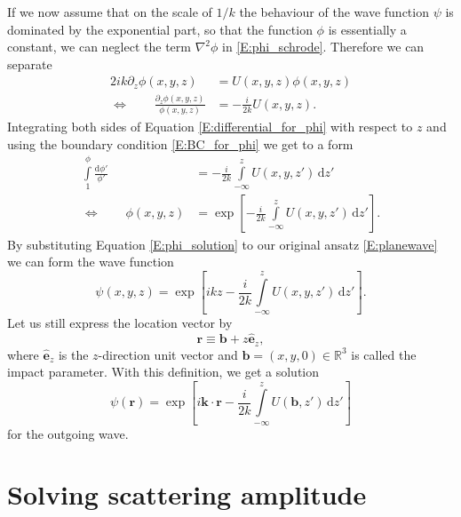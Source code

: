 \documentclass[a4paper, twoside, english, 12pt]{report}
\begin{document}
If we now assume that on the scale of $1/k$ the behaviour of the wave function $\psi$ is dominated by the exponential part, so that the function $\phi$ is essentially a constant, we can neglect the term $\nabla^2\phi$ in \eqref{E:phi_schrode}. Therefore we can separate
\begin{align}\label{E:differential_for_phi}
	2ik\partial_z\phi(x,y,z) &= U(x,y,z)\phi(x,y,z) \nonumber\\
\iff \qquad	\frac{\partial_z\phi(x,y,z)}{\phi(x,y,z)} &= -\frac{i}{2k}U(x,y,z).
\end{align}
Integrating both sides of Equation \eqref{E:differential_for_phi} with respect to $z$ and using the boundary condition \eqref{E:BC_for_phi} we get to a form
\begin{align}\label{E:phi_solution}
	\int\limits^{\phi}_{1}\frac{\text{d}\phi'}{\phi'} &= -\frac{i}{2k}\int\limits^{z}_{-\infty} U(x,y,z')\,\text{d}z' \nonumber\\
\iff \qquad	\phi(x,y,z) &= \exp\left[-\frac{i}{2k}\int\limits^{z}_{-\infty} U(x,y,z')\,\text{d}z'\right].
\end{align}
By substituting Equation \eqref{E:phi_solution} to our original ansatz \eqref{E:planewave} we can form the wave function
\begin{equation}\label{E:wave_function_solution_xyz}
	\psi(x,y,z) = \exp\left[ikz-\frac{i}{2k}\int\limits^{z}_{-\infty} U(x,y,z')\,\text{d}z'\right].
\end{equation}
Let us still express the location vector by 
\begin{equation}\label{E:impact_parameter}
	\mathbf{r}\equiv \mathbf{b}+z\hat{\mathbf{e}}_z,
\end{equation}
where $\hat{\mathbf{e}}_z$ is the $z$-direction unit vector and $\mathbf{b}=(x,y,0)\in\mathbb{R}^3$ is called the impact parameter. With this definition, we get a solution
\begin{equation}\label{E:wave_function_solution}
	\psi(\mathbf{r}) = \exp\left[i\mathbf{k}\cdot\mathbf{r}-\frac{i}{2k}\int\limits^{z}_{-\infty} U(\mathbf{b},z')\,\text{d}z'\right]
\end{equation}
for the outgoing wave.


\clearpage
\section{Solving scattering amplitude}\label{SS:scatt_amplitude}
\end{document}
